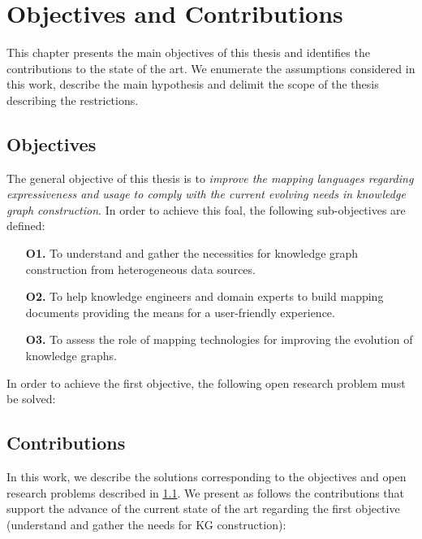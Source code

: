 \chapter{Objectives and Contributions}
\label{chapter:objectives}

This chapter presents the main objectives of this thesis and identifies the contributions to the state of the art. We enumerate the assumptions considered in this work, describe the main hypothesis and delimit the scope of the thesis describing the restrictions.

\section{Objectives}
\label{sec:chp3-objectives}

The general objective of this thesis is to \textit{improve the mapping languages regarding expressiveness and usage to comply with the current evolving needs in knowledge graph construction}. In order to achieve this foal, the following sub-objectives are defined:

\begin{enumerate}
    \item[\textbf{O1.}] To understand and gather the necessities for knowledge graph construction from heterogeneous data sources.
    \item[\textbf{O2.}] To help knowledge engineers and domain experts to build mapping documents providing the means for a user-friendly experience.
    \item[\textbf{O3.}] To assess the role of mapping technologies for improving the evolution of knowledge graphs. 
\end{enumerate}

In order to achieve the first objective, the following open research problem must be solved:

\section{Contributions}
\label{sec:chp3-contributions}

In this work, we describe the solutions corresponding to the objectives and open research problems described in \cref{sec:chp3-objectives}. We present as follows the contributions that support the advance of the current state of the art regarding the first objective (understand and gather the needs for KG construction):

